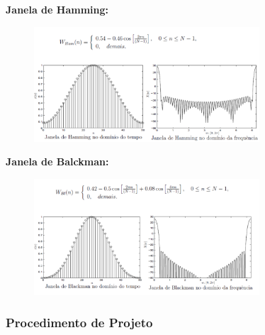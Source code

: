 \documentclass{article}
\begin{document}
\textbf{Janela de Hamming:}
\begin{figure}[h!]
    \centering
    \includegraphics[width=0.75\textwidth]{imgs/janela_hamming.png}
\end{figure}

\newpage
\textbf{Janela de Balckman:}
\begin{figure}[h!]
    \centering
    \includegraphics[width=0.75\textwidth]{imgs/janela_blackman.png}
\end{figure}

\subsubsection{Procedimento de Projeto}
\end{document}
